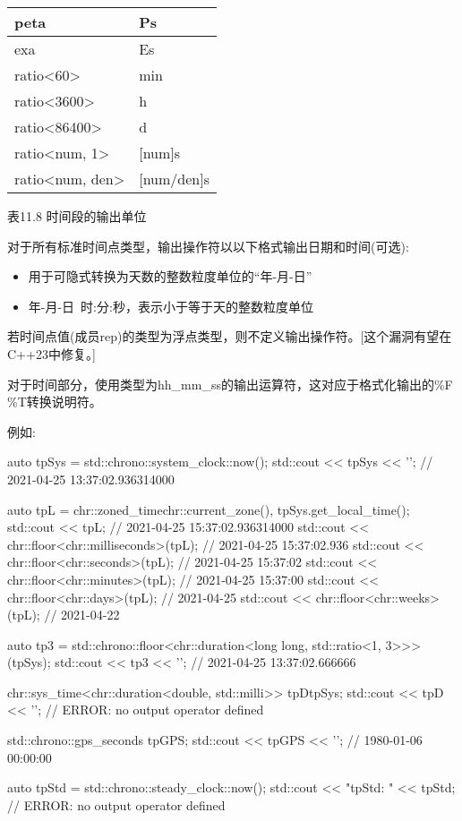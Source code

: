 \begin{longtable}[c]{|l|l|}
peta                                   & Ps                     \\ \hline
exa                                    & Es                     \\ \hline
ratio\textless{}60\textgreater{}       & min                    \\ \hline
ratio\textless{}3600\textgreater{}     & h                      \\ \hline
ratio\textless{}86400\textgreater{}    & d                      \\ \hline
ratio\textless{}num, 1\textgreater{}   & {[}num{]}s             \\ \hline
ratio\textless{}num, den\textgreater{} & {[}num/den{]}s         \\ \hline
\end{longtable}

\begin{center}
表11.8 时间段的输出单位
\end{center}

对于所有标准时间点类型，输出操作符以以下格式输出日期和时间(可选):

\begin{itemize}
\item
用于可隐式转换为天数的整数粒度单位的“年-月-日”

\item
年-月-日\ 时:分:秒，表示小于等于天的整数粒度单位
\end{itemize}

若时间点值(成员rep)的类型为浮点类型，则不定义输出操作符。[这个漏洞有望在C++23中修复。]

对于时间部分，使用类型为hh\_mm\_ss的输出运算符，这对应于格式化输出的\%F \%T转换说明符。

例如:

\begin{cpp}
auto tpSys = std::chrono::system_clock::now();
std::cout << tpSys << '\n'; // 2021-04-25 13:37:02.936314000

auto tpL = chr::zoned_time{chr::current_zone(), tpSys}.get_local_time();
std::cout << tpL; // 2021-04-25 15:37:02.936314000
std::cout << chr::floor<chr::milliseconds>(tpL); // 2021-04-25 15:37:02.936
std::cout << chr::floor<chr::seconds>(tpL); // 2021-04-25 15:37:02
std::cout << chr::floor<chr::minutes>(tpL); // 2021-04-25 15:37:00
std::cout << chr::floor<chr::days>(tpL); // 2021-04-25
std::cout << chr::floor<chr::weeks>(tpL); // 2021-04-22

auto tp3 = std::chrono::floor<chr::duration<long long, std::ratio<1, 3>>>(tpSys);
std::cout << tp3 << '\n'; // 2021-04-25 13:37:02.666666

chr::sys_time<chr::duration<double, std::milli>> tpD{tpSys};
std::cout << tpD << '\n'; // ERROR: no output operator defined

std::chrono::gps_seconds tpGPS;
std::cout << tpGPS << '\n'; // 1980-01-06 00:00:00

auto tpStd = std::chrono::steady_clock::now();
std::cout << "tpStd: " << tpStd; // ERROR: no output operator defined
\end{cpp}

